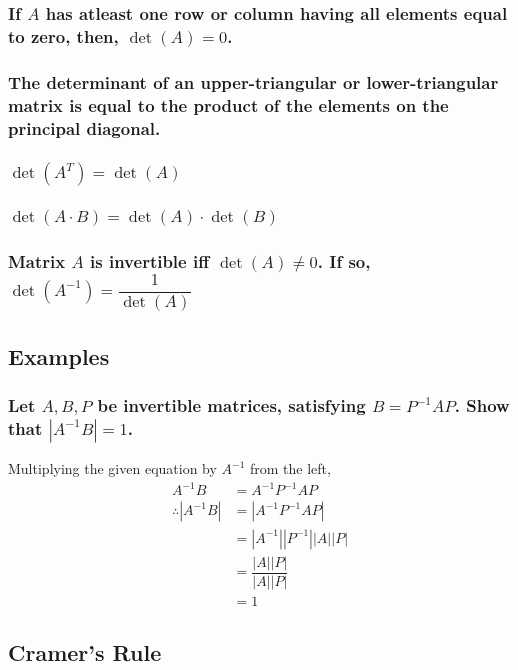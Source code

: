 \documentclass[fleqn]{article}
\begin{document}
\subsubsection{If $A$ has atleast one row or column having all elements equal to zero, then, $\det (A) = 0$.}

\subsubsection{The determinant of an upper-triangular or lower-triangular matrix is equal to the product of the elements on the principal diagonal.}

\subsubsection{$\det (A^T) = \det (A)$}

\subsubsection{$\det (A \cdot B) = \det (A) \cdot \det (B)$}

\subsubsection{Matrix $A$ is invertible iff $\det (A) \neq 0$. If so, $\det(A^{-1}) = \dfrac{1}{\det (A)}$}

\subsection{Examples}

\subsubsection{Let $A, B, P$ be invertible matrices, satisfying $B = P^{-1} A P$. Show that $|A^{-1} B| = 1$.}

Multiplying the given equation by $A^{-1}$ from the left, 
\begin{align*}
	A^{-1} B &= A^{-1} P^{-1} A P \\
	\therefore |A^{-1} B| &= |A^{-1} P^{-1} A P|\\
	&= |A^{-1}| |P^{-1}| |A| |P| \\
	&= \dfrac{|A| |P|}{|A| |P|} \\
	&= 1
\end{align*}

\subsection{Cramer's Rule}
\end{document}
